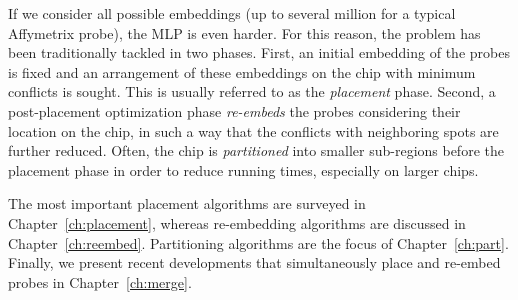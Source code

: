If we consider all possible embeddings (up to several million for a typical
Affymetrix probe), the MLP is even harder. For this reason, the problem has been
traditionally tackled in two phases. First, an initial embedding of the probes
is fixed and an arrangement of these embeddings on the chip with minimum
conflicts is sought. This is usually referred to as the \emph{placement} phase.
Second, a post-placement optimization phase \emph{re-embeds} the probes
considering their location on the chip, in such a way that the conflicts with
neighboring spots are further reduced. Often, the chip is \emph{partitioned}
into smaller sub-regions before the placement phase in order to reduce running
times, especially on larger chips.

The most important placement algorithms are surveyed in
Chapter~\ref{ch:placement}, whereas re-embedding algorithms are discussed in
Chapter~\ref{ch:reembed}. Partitioning algorithms are the focus of
Chapter~\ref{ch:part}. Finally, we present recent developments that
simultaneously place and re-embed probes in Chapter~\ref{ch:merge}.
